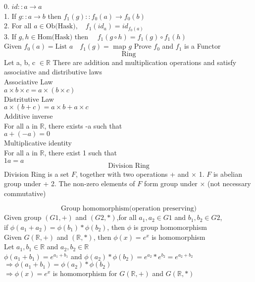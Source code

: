 \documentclass{book}
\begin{document}
0. $id::a \rightarrow a $ \\
1. If $g::a \rightarrow b $ then $f_1(g)::f_0(a) \rightarrow f_0(b)$ \\
2. For all $a \in \mbox{Ob(Hask)}, \quad f_1(id_a) = id_{f_0(a)} $ \\
3. If $g,h \in \mbox{Hom(Hask)} \mbox{ then } \quad f_1(g \circ h) = f_1(g) \circ f_1(h)$ \\
Given $f_0(a) = \mbox{List } a \quad f_1(g) = \mbox{ map } g   $ \medskip 
Prove $f_0$ and $f_1$ is a Functor \\

\[ \text{ Ring } \]
Let a, b, c $\in  \mathbb{R}$ There are addition and multiplication operations and satisfy associative and distributive laws\\

Associative Law\\
$ a \times b \times c = a \times (b \times c) $\\

Distritutive Law\\
$a \times (b + c) = a \times b + a \times c $\\

Additive inverse\\
For all a in $\mathbb{R}$, there exists -a such that\\
$a + (-a) = 0$\\

Multiplicative identity \\
For all a in $\mathbb{R}$, there exist 1 such that\\
$1a = a$ \\

\[ \text{Division Ring} \] 
Division Ring is a set $F$, together with two operations + and $\times$ 
1. $F$ is abelian group under +
2. The non-zero elements of $F$ form group under $\times$ (not necessary commutative)

\[\text{Group homomorphism(operation preserving)}\]
Given group $(G1, +)$ and $(G2, *)$,for all $a_1, a_2 \in G1$ and $b_1, b_2 \in G2$,\\
if $\phi(a_1 + a_2) = \phi(b_1)*\phi(b_2)$, then $\phi$ is group homomorphism\\

Given $G(\mathbb{R}, +)$ and $(\mathbb{R}, *)$, then $\phi(x) = e^x$ is homomorphism\\ 
Let $a_1, b_1 \in \mathbb{R}$ and $a_2, b_2 \in \mathbb{R}$\\ 
$\phi(a_1+b_1) = e^{a_1 + b_1}$ and $\phi(a_2)*\phi(b_2) = e^{a_2}*e^{b_2} = e^{a_2+b_2}$\\
$\Rightarrow \phi(a_1 + b_1) = \phi(a_2)*\phi(b_2)$\\
$\Rightarrow \phi(x) = e^{x}$ is homomorphism for $G(\mathbb{R}, +)$ and $G(\mathbb{R}, *)$
\end{document}
